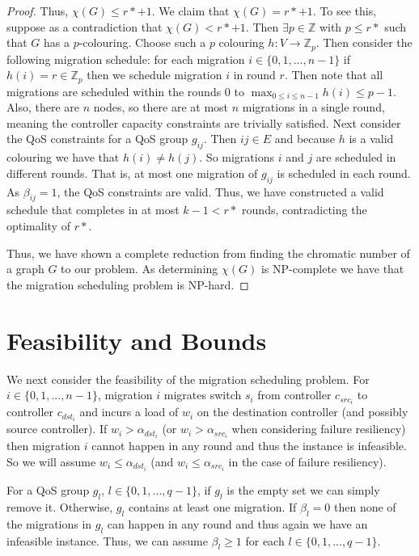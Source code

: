 \documentclass[conference]{IEEEtran}
\begin{document}
\begin{proof}
    Thus, $\chi(G) \leq r* + 1$. We claim that $\chi(G) = r* + 1$. To see this, suppose as a contradiction that $\chi(G) < r* + 1$. Then $\exists p \in \mathbb{Z}$ with $p \leq r*$ such that $G$ has a $p$-colouring. Choose such a $p$ colouring $h: V \rightarrow \mathbb{Z}_{p}$. Then consider the following migration schedule: for each migration $i \in \{0, 1, ..., n-1\}$ if $h(i) = r \in \mathbb{Z}_{p}$ then we schedule migration $i$ in round $r$. Then note that all migrations are scheduled within the rounds 0 to $\max_{0 \leq i \leq n-1} h(i) \leq p - 1$. Also, there are $n$ nodes, so there are at most $n$ migrations in a single round, meaning the controller capacity constraints are trivially satisfied. Next consider the QoS constraints for a QoS group $g_{ij}$. Then $ij \in E$ and because $h$ is a valid colouring we have that $h(i) \neq h(j)$. So migrations $i$ and $j$ are scheduled in different rounds. That is, at most one migration of $g_{ij}$ is scheduled in each round. As $\beta_{ij} = 1$, the QoS constraints are valid. Thus, we have constructed a valid schedule that completes in at most $k - 1 < r*$ rounds, contradicting the optimality of $r*$.
    
    Thus, we have shown a complete reduction from finding the chromatic number of a graph $G$ to our problem. As determining $\chi(G)$ is NP-complete we have that the migration scheduling problem is NP-hard. 
\end{proof}

\section{Feasibility and Bounds}
\noindent We next consider the feasibility of the migration scheduling problem. For $i \in \{0, 1, ..., n-1\}$, migration $i$ migrates switch $s_{i}$ from controller $c_{src_{i}}$ to controller $c_{dst_{i}}$ and incurs a load of $w_{i}$ on the destination controller (and possibly source controller). If $w_{i} > \alpha_{dst_{i}}$ (or $w_{i} > \alpha_{src_{i}}$ when considering failure resiliency) then migration $i$ cannot happen in any round and thus the instance is infeasible. So we will assume $w_{i} \leq \alpha_{dst_{i}}$ (and $w_{i} \leq \alpha_{src_{i}}$ in the case of failure resiliency).

For a QoS group $g_{l}$, $l \in \{0, 1, ..., q - 1\}$, if $g_{l}$ is the empty set we can simply remove it. Otherwise, $g_{l}$ contains at least one migration. If $\beta_{l} = 0$ then none of the migrations in $g_{l}$ can happen in any round and thus again we have an infeasible instance. Thus, we can assume $\beta_{l} \geq 1$ for each $l \in \{0, 1, ..., q - 1\}$.
\end{document}
